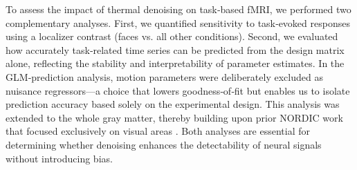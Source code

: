 To assess the impact of thermal denoising on task‑based fMRI, we performed two complementary analyses. First, we quantified sensitivity to task‑evoked responses using a localizer contrast (faces vs. all other conditions). Second, we evaluated how accurately task‑related time series can be predicted from the design matrix alone, reflecting the stability and interpretability of parameter estimates. In the GLM‑prediction analysis, motion parameters were deliberately excluded as nuisance regressors—a choice that lowers goodness‑of‑fit but enables us to isolate prediction accuracy based solely on the experimental design. This analysis was extended to the whole gray matter, thereby building upon prior NORDIC work that focused exclusively on visual areas \citep{dowdle2023evaluating,vizioli2021lowering}. Both analyses are essential for determining whether denoising enhances the detectability of neural signals without introducing bias.

